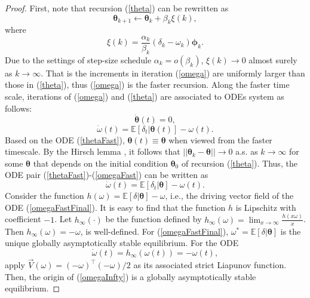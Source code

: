 \begin{proof}
    First, note that recursion (\ref{theta}) can be rewritten as
    \begin{equation*}
    \bm{\bm{\theta}}_{k+1}\leftarrow \bm{\bm{\theta}}_k+\beta_k\xi(k),
    \end{equation*}
    where
    \begin{equation*}
    \xi(k)=\frac{\alpha_k}{\beta_k}(\delta_k-\omega_k)\bm{\bm{\phi}}_k.
    \end{equation*}
    Due to the settings of step-size schedule $\alpha_k = o(\beta_k)$,
    $\xi(k)\rightarrow 0$ almost surely as $k\rightarrow\infty$. 
    That is the increments in iteration (\ref{omega}) are uniformly larger than
    those in (\ref{theta}), thus (\ref{omega}) is the faster recursion.
    Along the faster time scale, iterations of (\ref{omega}) and (\ref{theta})
    are associated to ODEs system as follows:
    \begin{equation}
    \dot{\bm{\bm{\theta}}}(t) = 0,
    \label{thetaFast}
    \end{equation}
    \begin{equation}
    \dot{\omega}(t)=\mathbb{E}[\delta_t|\bm{\bm{\theta}}(t)]-\omega(t).
    \label{omegaFast}
    \end{equation}
    Based on the ODE (\ref{thetaFast}), $\bm{\bm{\theta}}(t)\equiv \bm{\bm{\theta}}$ when
    viewed from the faster timescale. 
    By the Hirsch lemma \cite{hirsch1989convergent}, it follows that
    $||\bm{\bm{\theta}}_k-\bm{\bm{\theta}}||\rightarrow 0$ a.s. as $k\rightarrow \infty$ for some
    $\bm{\bm{\theta}}$ that depends on the initial condition $\bm{\bm{\theta}}_0$ of recursion
    (\ref{theta}).
    Thus, the ODE pair (\ref{thetaFast})-(\ref{omegaFast}) can be written as
    \begin{equation}
    \dot{\omega}(t)=\mathbb{E}[\delta_t|\bm{\bm{\theta}}]-\omega(t).
    \label{omegaFastFinal}
    \end{equation}
    Consider the function $h(\omega)=\mathbb{E}[\delta|\bm{\bm{\theta}}]-\omega$,
    i.e., the driving vector field of the ODE (\ref{omegaFastFinal}).
    It is easy to find that the function $h$ is Lipschitz with coefficient
    $-1$.
    Let $h_{\infty}(\cdot)$ be the function defined by
     $h_{\infty}(\omega)=\lim_{x\rightarrow \infty}\frac{h(x\omega)}{x}$.
     Then  $h_{\infty}(\omega)= -\omega$,  is well-defined. 
     For (\ref{omegaFastFinal}), $\omega^*=\mathbb{E}[\delta|\bm{\bm{\theta}}]$
    is the unique globally asymptotically stable equilibrium.
     For the ODE
      \begin{equation}
     \dot{\omega}(t) = h_{\infty}(\omega(t))= -\omega(t),
     \label{omegaInfty}
     \end{equation}
     apply $\vec{V}(\omega)=(-\omega)^{\top}(-\omega)/2$ as its
    associated strict Liapunov function. Then,
    the origin of (\ref{omegaInfty}) is a globally asymptotically stable
    equilibrium.
    

\end{proof}
